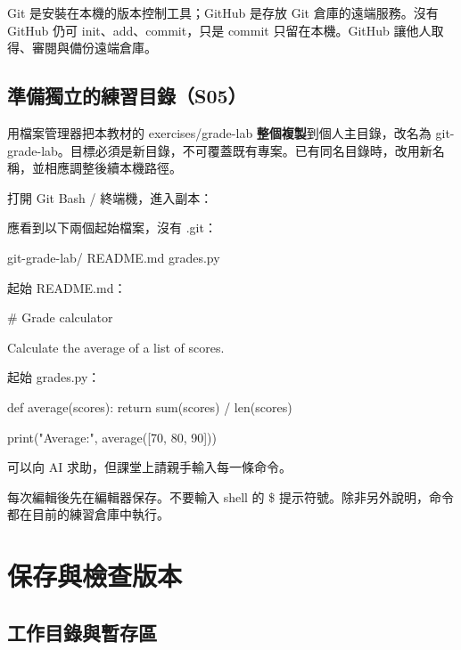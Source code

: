 \documentclass[11pt,a4paper]{article}
\DeclareRobustCommand{\code}[1]{{\small\ttfamily #1}}
\begin{document}
Git 是安裝在本機的版本控制工具；GitHub 是存放 Git 倉庫的遠端服務。沒有 GitHub 仍可 \code{init}、\code{add}、\code{commit}，只是 commit 只留在本機。GitHub 讓他人取得、審閱與備份遠端倉庫。

\subsection{準備獨立的練習目錄（S05）}

{\sloppy
用檔案管理器把本教材的 \code{exercises/grade-lab} \textbf{整個複製}到個人主目錄，改名為 \code{git-grade-lab}。目標必須是新目錄，不可覆蓋既有專案。已有同名目錄時，改用新名稱，並相應調整後續本機路徑。\par
}

打開 Git Bash / 終端機，進入副本：


應看到以下兩個起始檔案，沒有 \code{.git}：

\begin{Code}
git-grade-lab/
  README.md
  grades.py
\end{Code}

起始 \code{README.md}：

\begin{Code}
# Grade calculator

Calculate the average of a list of scores.
\end{Code}

起始 \code{grades.py}：

\begin{Code}
def average(scores):
    return sum(scores) / len(scores)


print("Average:", average([70, 80, 90]))
\end{Code}

可以向 AI 求助，但課堂上請親手輸入每一條命令。

每次編輯後先在編輯器保存。不要輸入 shell 的 \code{\$} 提示符號。除非另外說明，命令都在目前的練習倉庫中執行。

\section{保存與檢查版本}

\subsection{工作目錄與暫存區}
\end{document}
